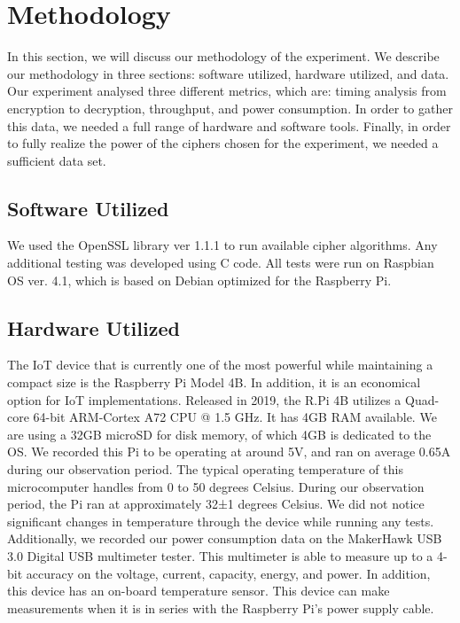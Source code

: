 \documentclass[conference]{IEEEtran}
\begin{document}
\section{Methodology}
In this section, we will discuss our methodology of the experiment. We describe our methodology in three sections: software utilized, hardware utilized, and data. Our experiment analysed three different metrics, which are: timing analysis from encryption to decryption, throughput, and power consumption. In order to gather this data, we needed a full range of hardware and software tools. Finally, in order to fully realize the power of the ciphers chosen for the experiment, we needed a sufficient data set. 

\subsection{Software Utilized}
We used the OpenSSL library ver 1.1.1 to run available cipher algorithms. Any additional testing was developed using C code. All tests were run on Raspbian OS ver. 4.1, which is based on Debian optimized for the Raspberry Pi.

\subsection{Hardware Utilized}
The IoT device that is currently one of the most powerful while maintaining a compact size is the Raspberry Pi Model 4B. In addition, it is an economical option for IoT implementations. Released in 2019, the R.Pi 4B utilizes a Quad-core 64-bit ARM-Cortex A72 CPU @ 1.5 GHz. It has 4GB RAM available. We are using a 32GB microSD for disk memory, of which 4GB is dedicated to the OS. We recorded this Pi to be operating at around 5V, and ran on average 0.65A during our observation period. The typical operating temperature of this microcomputer handles from 0 to 50 degrees Celsius. During our observation period, the Pi ran at approximately 32±1 degrees Celsius. We did not notice significant changes in temperature through the device while running any tests.
Additionally, we recorded our power consumption data on the MakerHawk USB 3.0 Digital USB multimeter tester. This multimeter is able to measure up to a 4-bit accuracy on the voltage, current, capacity, energy, and power. In addition, this device has an on-board temperature sensor. This device can make measurements when it is in series with the Raspberry Pi’s power supply cable.
\end{document}
